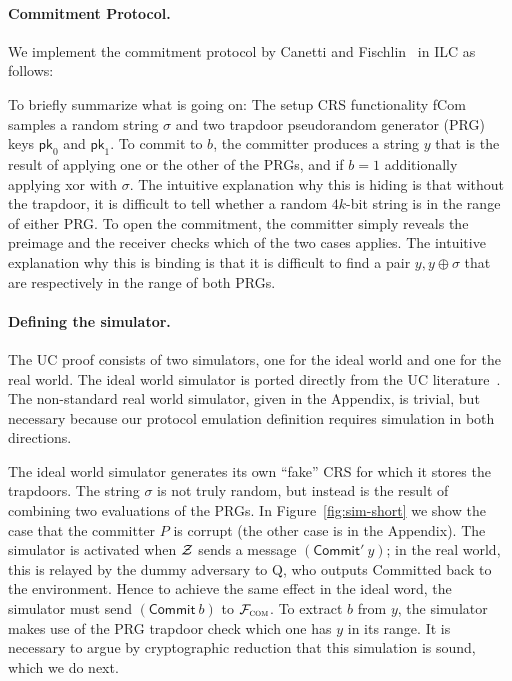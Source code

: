 \paragraph{Commitment Protocol.}
We implement the commitment protocol by Canetti and
Fischlin~\cite{canetti2001commitments} in ILC as follows:

To briefly summarize what is going on: The setup CRS functionality \textsf{fCom}
samples a random string $\sigma$ and two trapdoor pseudorandom generator (PRG) keys
$\mathsf{pk}_0$ and $\mathsf{pk}_1$.
To commit to $b$, the committer produces a string $y$ that is the result of applying one or the other of the PRGs, and if $b=1$ additionally applying xor with $\sigma$.
The intuitive explanation why this is hiding is that without the trapdoor, it is difficult to tell whether a random $4k$-bit string is in the range of either PRG. To open the commitment, the committer simply reveals the preimage and the receiver checks which of the two cases applies. The intuitive explanation why this is binding is that it is difficult to find a pair $y,y\oplus\sigma$ that are respectively in the range of both PRGs.

\paragraph{Defining the simulator.}
The UC proof consists of two simulators, one for the ideal world and one for the real world.
The ideal world simulator is ported directly from the UC literature~\cite{canetti2001commitments}. The non-standard real world simulator, given in the Appendix, is trivial, but necessary because our protocol emulation definition requires simulation in both directions.

The ideal world simulator generates its own ``fake'' CRS for which it stores the
trapdoors. The string $\sigma$ is not truly random, but instead is the result of
combining two evaluations of the PRGs. In Figure~\ref{fig:sim-short} we show the
case that the committer $P$ is corrupt (the other case is in the Appendix). The
simulator is activated when $\mathcal{{Z}}$ sends a message $(\mathsf{Commit}' ~ y)$;
in the real world, this is relayed by the dummy adversary to Q, who outputs
\textsf{Committed} back to the environment. Hence to achieve the same effect in
the ideal word, the simulator must send $(\mathsf{Commit}~b)$ to
$\mathcal{{F}}_{\textsc{com}}$. To extract $b$ from $y$, the simulator makes use of the
PRG trapdoor check which one has $y$ in its range.  It is necessary to argue by
cryptographic reduction that this simulation is sound, which we do next.

